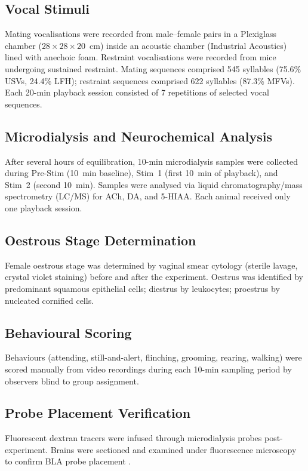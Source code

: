 \documentclass[11pt]{article}
\begin{document}
\subsection{Vocal Stimuli}
Mating vocalisations were recorded from male--female pairs in a Plexiglass chamber ($28 \times 28 \times 20$~cm) inside an acoustic chamber (Industrial Acoustics) lined with anechoic foam. Restraint vocalisations were recorded from mice undergoing sustained restraint. Mating sequences comprised 545 syllables (75.6\% USVs, 24.4\% LFH); restraint sequences comprised 622 syllables (87.3\% MFVs). Each 20-min playback session consisted of 7 repetitions of selected vocal sequences.

\subsection{Microdialysis and Neurochemical Analysis}
After several hours of equilibration, 10-min microdialysis samples were collected during Pre-Stim (10~min baseline), Stim~1 (first 10~min of playback), and Stim~2 (second 10~min). Samples were analysed via liquid chromatography/mass spectrometry (LC/MS) for ACh, DA, and 5-HIAA. Each animal received only one playback session.

\subsection{Oestrous Stage Determination}
Female oestrous stage was determined by vaginal smear cytology (sterile lavage, crystal violet staining) before and after the experiment. Oestrus was identified by predominant squamous epithelial cells; diestrus by leukocytes; proestrus by nucleated cornified cells.

\subsection{Behavioural Scoring}
Behaviours (attending, still-and-alert, flinching, grooming, rearing, walking) were scored manually from video recordings during each 10-min sampling period by observers blind to group assignment.

\subsection{Probe Placement Verification}
Fluorescent dextran tracers were infused through microdialysis probes post-experiment. Brains were sectioned and examined under fluorescence microscopy to confirm BLA probe placement \citep{paxinos2001mouse}.
\end{document}
